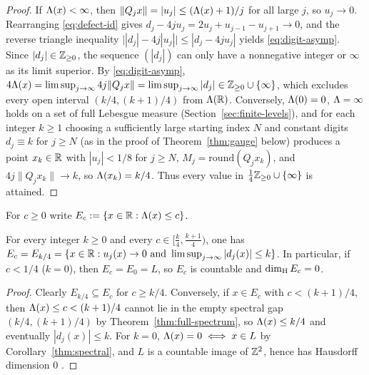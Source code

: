 \begin{proof}
If $\Lambda(x)<\infty$, then $\|Q_jx\|=|u_j|\le(\Lambda(x)+1)/j$ for all large $j$,
so $u_j\to0$. Rearranging \eqref{eq:defect-id} gives
$d_j-4ju_j=2u_j+u_{j-1}-u_{j+1}\to0$, and the reverse triangle inequality
$\bigl||d_j|-4j|u_j|\bigr|\le|d_j-4ju_j|$ yields \eqref{eq:digit-asymp}.
Since $|d_j|\in\mathbb{Z}_{\ge0}$, the sequence $(|d_j|)$ can only have a nonnegative
integer or $\infty$ as its limit superior. By \eqref{eq:digit-asymp},
$4\Lambda(x)=\limsup_{j\to\infty}4j\|Q_jx\|=\limsup_{j\to\infty}|d_j|\in\mathbb{Z}_{\ge0}\cup\{\infty\}$,
which excludes every open interval $(k/4,(k+1)/4)$ from $\Lambda(\mathbb{R})$.
Conversely, $\Lambda(0)=0$, $\Lambda=\infty$ holds on a set of full Lebesgue measure
(Section~\ref{sec:finite-levels}), and for each integer $k\ge1$ choosing a
sufficiently large starting index $N$ and constant digits $d_j\equiv k$ for
$j\ge N$ (as in the proof of Theorem~\ref{thm:gauge} below) produces a point
$x_k\in\mathbb{R}$ with $|u_j|<1/8$ for $j\ge N$, $M_j=\mathrm{round}(Q_jx_k)$, and
$4j\|Q_jx_k\|\to k$, so $\Lambda(x_k)=k/4$. Thus every value in
$\frac14\mathbb{Z}_{\ge0}\cup\{\infty\}$ is attained.
\end{proof}

For $c\ge0$ write $E_c:=\{x\in\mathbb{R}:\Lambda(x)\le c\}$.

\begin{corollary}\label{thm:sub}
For every integer $k\ge0$ and every $c\in\bigl[\frac{k}{4},\frac{k+1}{4}\bigr)$,
one has $E_c=E_{k/4}=\{x\in\mathbb{R}:u_j(x)\to0\text{ and }\limsup_{j\to\infty}|d_j(x)|\le k\}$.
In particular, if $c<1/4$ ($k=0$), then $E_c=E_0=L$, so $E_c$ is countable and
$\dim_{\mathrm{H}} E_c=0$.
\end{corollary}

\begin{proof}
Clearly $E_{k/4}\subseteq E_c$ for $c\ge k/4$. Conversely, if $x\in E_c$ with
$c<(k+1)/4$, then $\Lambda(x)\le c<(k+1)/4$ cannot lie in the empty spectral gap
$(k/4,(k+1)/4)$ by Theorem~\ref{thm:full-spectrum}, so $\Lambda(x)\le k/4$ and
eventually $|d_j(x)|\le k$. For $k=0$, $\Lambda(x)=0\iff x\in L$ by
Corollary~\ref{thm:spectral}, and $L$ is a countable image of $\mathbb{Z}^2$, hence has
Hausdorff dimension $0$ \cite{Falconer}.
\end{proof}

